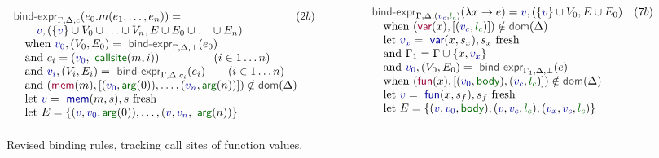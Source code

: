 \documentclass[acmsmall,anonymous,fleqn]{acmart}\settopmatter{printfolios=false,printccs=false,printacmref=false}
\theoremstyle{plain}
\theoremstyle{definition}
\newcommand{\ident}[1]{\textnormal{\textcolor{idclr}{\sffamily #1}}}
\newcommand{\bndclr}[1]{\textcolor{kvdclr}{#1}}
\newcommand{\blblclr}[1]{\textcolor{numclr}{#1}}
\newcommand{\bnd}[1]{\textnormal{\textcolor{kvdclr}{\sffamily #1}}}
\newcommand{\bknd}[1]{\textnormal{\textcolor{prepclr}{\sffamily #1}}}
\newcommand{\blbl}[1]{\textnormal{\textcolor{numclr}{\sffamily #1}}}
\begin{document}
\begin{figure}[t]
\vspace{-0.5em}
\begin{equation*}
\begin{array}{ll}
\ident{bind-expr}_{\Gamma, \Delta, c}(e_0.m(e_1, \ldots, e_n)) = &(2b)\\
\qquad \bndclr{v}, (\{\bndclr{v}\} \cup V_0 \cup \ldots \cup V_n, E \cup E_0 \cup \ldots \cup E_n)\\
\quad \textnormal{when}~\bndclr{v_0}, (V_0, E_0) = \ident{bind-expr}_{\Gamma, \Delta, \bot}(e_0)\\
\quad \textnormal{and}~c_i = (\bndclr{v_0}, \blbl{callsite}(m,i))\hspace{4.8em} (i \in 1\ldots n)\\
\quad \textnormal{and}~\bndclr{v_i}, (V_i, E_i) = \ident{bind-expr}_{\Gamma, \Delta, c_i}(e_i)\qquad (i\in 1\ldots n)\\
\quad \textnormal{and}~(\bknd{mem}(m),[(\bndclr{v_0}, \blbl{arg}(0)), \ldots, (\bndclr{v_n}, \blbl{arg}(n))]) \notin \ident{dom}(\Delta)\hspace{-200em}.\\
\quad \textnormal{let}~\bndclr{v} = \bnd{mem}(m, s), s~\textnormal{fresh}\\
\quad \textnormal{let}~E = \{ (\bndclr{v}, \bndclr{v_0}, \blbl{arg}(0)), \ldots, (\bndclr{v},\bndclr{v_n}, \blbl{arg}(n)) \}
\end{array}
\qquad\qquad
\begin{array}{ll}
\ident{bind-expr}_{\Gamma, \Delta, (\bndclr{v_c}, \blblclr{l_c} )}(\lambda x \rightarrow e) = \bndclr{v}, (\{\bndclr{v}\} \cup V_0, E \cup E_0)&(7b)\\
\quad \textnormal{when}~(\bknd{var}(x),[(\bndclr{v_c}, \blblclr{l_c} )])\notin \ident{dom}(\Delta)\\
\quad \textnormal{let}~\bndclr{v_x} = \bnd{var}(x, s_x), s_x~\textnormal{fresh}\\
\quad \textnormal{and}~\Gamma_1 = \Gamma \cup \{ x, \bndclr{v_x} \}\\
\quad \textnormal{and}~\bndclr{v_0}, (V_0, E_0) = \ident{bind-expr}_{\Gamma_1, \Delta, \bot}(e)\\
\quad \textnormal{when}~(\bknd{fun}(x),[(\bndclr{v_0}, \blbl{body}), (\bndclr{v_c}, \blblclr{l_c} )])\notin \ident{dom}(\Delta)\\
\quad \textnormal{let}~\bndclr{v} = \bnd{fun}(x, s_f), s_f~\textnormal{fresh}\\
\quad \textnormal{let}~E = \{ (\bndclr{v},\bndclr{v_0},\blbl{body}), (\bndclr{v},\bndclr{v_c},\blblclr{l_c}), (\bndclr{v_x},\bndclr{v_c},\blblclr{l_c}) \}
\\[0.75em]
\end{array}
\end{equation*}
\vspace{-0.5em}
\caption{Revised binding rules, tracking call sites of function values.}
\label{fig:binding-rules-callsite}
\vspace{-0.5em}
\end{figure}
\end{document}

